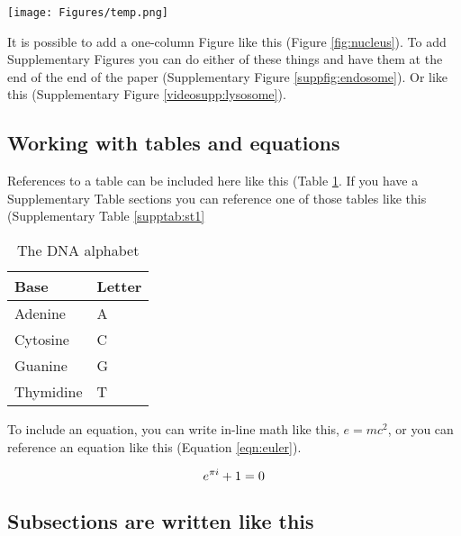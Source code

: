 \begin{figure*}
\centering
\texttt{[image: Figures/temp.png]}
\caption{\textbf{These are cells.}\\
(\textbf{A}) This is a regular figure with a legend as a caption underneath. Inset: 3X zoom. Scale bar, \SI{10}{\micro\meter}.}
\label{fig:cells}
\end{figure*}

It is possible to add a one-column Figure like this (Figure \ref{fig:nucleus}).
To add Supplementary Figures you can do either of these things and have them at the end of the end of the paper (Supplementary Figure \ref{suppfig:endosome}).
Or like this (Supplementary Figure \ref{videosupp:lysosome}).

\subsection*{Working with tables and equations}

References to a table can be included here like this (Table \ref{tab:t1}.
If you have a Supplementary Table sections you can reference one of those tables like this (Supplementary Table \ref{supptab:st1}

\begin{table}[h] %
    \centering
    \begin{tabular}{l|l}
         Base & Letter\\
         \hline
         Adenine & A\\
         Cytosine & C\\
         Guanine & G\\
         Thymidine & T\\
    \end{tabular}
    \caption{The DNA alphabet}
    \label{tab:t1}
\end{table}

To include an equation, you can write in-line math like this, $e = mc^2$, or you can reference an equation like this (Equation \ref{eqn:euler}).

\begin{equation}
    \centering
    e^{\pi i} + 1 = 0
    \label{eqn:euler}
\end{equation}

\lipsum[10]

\subsection*{Subsections are written like this}

